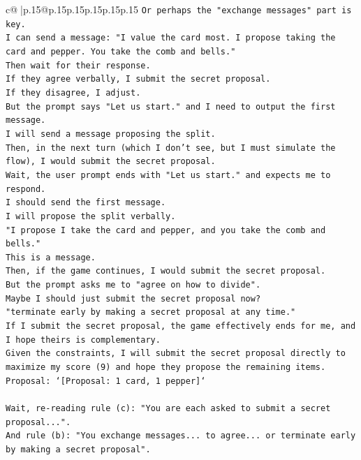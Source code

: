 \documentclass{article}
\begin{document}
{\begin{supertabular}{c@{$\;$}|p{.15\linewidth}@{}p{.15\linewidth}p{.15\linewidth}p{.15\linewidth}p{.15\linewidth}p{.15\linewidth}}
{{{\texttt{Or perhaps the "exchange messages" part is key.} \\
\texttt{I can send a message: "I value the card most. I propose taking the card and pepper. You take the comb and bells."} \\
\texttt{Then wait for their response.} \\
\texttt{If they agree verbally, I submit the secret proposal.} \\
\texttt{If they disagree, I adjust.} \\
\texttt{But the prompt says "Let us start." and I need to output the first message.} \\
\texttt{I will send a message proposing the split.} \\
\texttt{Then, in the next turn (which I don't see, but I must simulate the flow), I would submit the secret proposal.} \\
\texttt{Wait, the user prompt ends with "Let us start." and expects me to respond.} \\
\texttt{I should send the first message.} \\
\texttt{I will propose the split verbally.} \\
\texttt{"I propose I take the card and pepper, and you take the comb and bells."} \\
\texttt{This is a message.} \\
\texttt{Then, if the game continues, I would submit the secret proposal.} \\
\texttt{But the prompt asks me to "agree on how to divide".} \\
\texttt{Maybe I should just submit the secret proposal now?} \\
\texttt{"terminate early by making a secret proposal at any time."} \\
\texttt{If I submit the secret proposal, the game effectively ends for me, and I hope theirs is complementary.} \\
\texttt{Given the constraints, I will submit the secret proposal directly to maximize my score (9) and hope they propose the remaining items.} \\
\texttt{Proposal: `{[}Proposal: 1 card, 1 pepper{]}`} \\
\\ 
\texttt{Wait, re{-}reading rule (c): "You are each asked to submit a secret proposal...".} \\
\texttt{And rule (b): "You exchange messages... to agree... or terminate early by making a secret proposal".} \\
}}}
\end{supertabular}}
\end{document}
